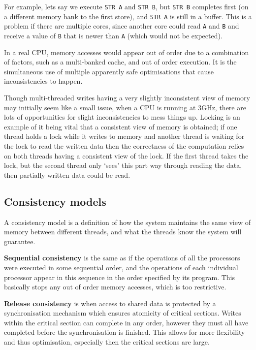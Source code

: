 For example, lets say we execute \texttt{STR A} and \texttt{STR B},
but \texttt{STR B} completes first (on a different memory bank to the
first store), and \texttt{STR A} is still in a buffer. This is a
problem if there are multiple cores, since another core could
read \texttt{A} and \texttt{B} and receive a value of \texttt{B} that
is newer than \texttt{A} (which would not be expected).

In a real CPU, memory accesses would appear out of order due to a
combination of factors, such as a multi-banked cache, and out of order
execution. It is the simultaneous use of multiple apparently safe
optimisations that cause inconsistencies to happen.

Though multi-threaded writes having a very slightly inconsistent view
of memory may initially seem like a small issue, when a CPU is running
at $3\si{\giga\hertz}$, there are lots of opportunities for slight
inconsistencies to mess things up. Locking is an example of it being
vital that a consistent view of memory is obtained; if one thread
holds a lock while it writes to memory and another thread is waiting
for the lock to read the written data then the correctness of the
computation relies on both threads having a consistent view of the
lock. If the first thread takes the lock, but the second thread only
`sees' this part way through reading the data, then partially written
data could be read.

\subsection{Consistency models}

A consistency model is a definition of how the system maintains the
same view of memory between different threads, and what the threads
know the system will guarantee.

\textbf{Sequential consistency} is the same as if the operations
of all the processors were executed in some sequential order, and the
operations of each individual processor appear in this sequence in the
order specified by its program. This basically stops any out of order
memory accesses, which is too restrictive.

\textbf{Release consistency} is when access to shared data is
protected by a synchronisation mechanism which ensures atomicity of
critical sections. Writes within the critical section can complete in
any order, however they must all have completed before the
synchronisation is finished. This allows for more flexibility and
thus optimisation, especially then the critical sections are large.

